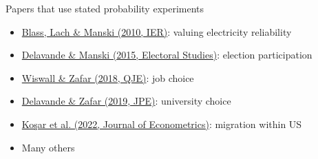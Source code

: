 \documentclass[aspectratio=169]{beamer}
\begin{document}
\begin{frame}

Papers that use stated probability experiments

\bigskip

\begin{itemize}
\itemsep1.5em
\item<2-> \href{https://onlinelibrary.wiley.com/doi/full/10.1111/j.1468-2354.2010.00586.x}{Blass, Lach \& Manski (2010, IER)}: valuing electricity reliability
\item<3-> \href{https://www.sciencedirect.com/science/article/abs/pii/S0261379415000086}{Delavande \& Manski (2015, Electoral Studies)}: election participation
\item<4-> \href{https://academic.oup.com/qje/article/133/1/457/4095201}{Wiswall \& Zafar (2018, QJE)}: job choice
\item<5-> \href{https://www.journals.uchicago.edu/doi/full/10.1086/701808}{Delavande \& Zafar (2019, JPE)}: university choice
\item<6-> \href{https://www.sciencedirect.com/science/article/abs/pii/S0304407621000415}{Ko\c{s}ar et al. (2022, Journal of Econometrics)}: migration within US
\item<7-> Many others
\end{itemize}

\end{frame}
\end{document}
